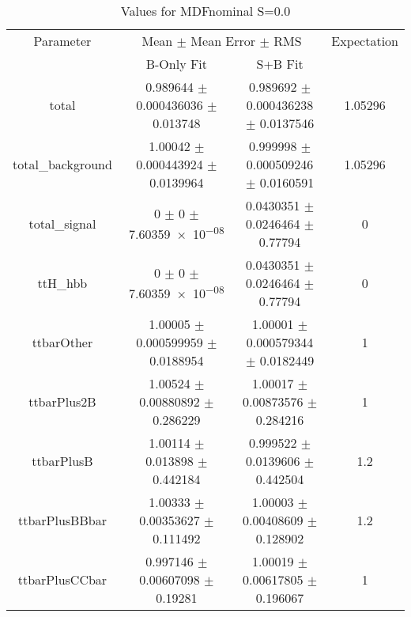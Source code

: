 \begin{table}
\centering
\caption{Values for MDFnominal S=0.0}
\begin{tabular}{cccc}
\toprule
Parameter & \multicolumn{2}{c}{Mean $\pm$ Mean Error $\pm$ RMS} & Expectation\\
 & B-Only Fit & S+B Fit & \\
\midrule
total & \num{0.989644} $\pm$ \num{0.000436036} $\pm$ \num{0.013748} & \num{0.989692} $\pm$ \num{0.000436238} $\pm$ \num{0.0137546} & \num{1.05296}\\
total\_background & \num{1.00042} $\pm$ \num{0.000443924} $\pm$ \num{0.0139964} & \num{0.999998} $\pm$ \num{0.000509246} $\pm$ \num{0.0160591} & \num{1.05296}\\
total\_signal & \num{0} $\pm$ \num{0} $\pm$ \num{7.60359e-08} & \num{0.0430351} $\pm$ \num{0.0246464} $\pm$ \num{0.77794} & \num{0}\\
ttH\_hbb & \num{0} $\pm$ \num{0} $\pm$ \num{7.60359e-08} & \num{0.0430351} $\pm$ \num{0.0246464} $\pm$ \num{0.77794} & \num{0}\\
ttbarOther & \num{1.00005} $\pm$ \num{0.000599959} $\pm$ \num{0.0188954} & \num{1.00001} $\pm$ \num{0.000579344} $\pm$ \num{0.0182449} & \num{1}\\
ttbarPlus2B & \num{1.00524} $\pm$ \num{0.00880892} $\pm$ \num{0.286229} & \num{1.00017} $\pm$ \num{0.00873576} $\pm$ \num{0.284216} & \num{1}\\
ttbarPlusB & \num{1.00114} $\pm$ \num{0.013898} $\pm$ \num{0.442184} & \num{0.999522} $\pm$ \num{0.0139606} $\pm$ \num{0.442504} & \num{1.2}\\
ttbarPlusBBbar & \num{1.00333} $\pm$ \num{0.00353627} $\pm$ \num{0.111492} & \num{1.00003} $\pm$ \num{0.00408609} $\pm$ \num{0.128902} & \num{1.2}\\
ttbarPlusCCbar & \num{0.997146} $\pm$ \num{0.00607098} $\pm$ \num{0.19281} & \num{1.00019} $\pm$ \num{0.00617805} $\pm$ \num{0.196067} & \num{1}\\
\bottomrule
\end{tabular}
\end{table}